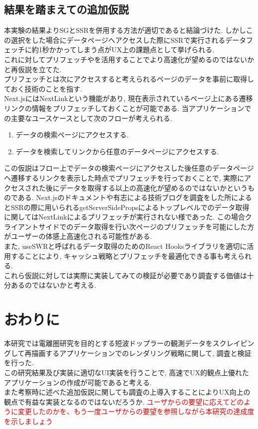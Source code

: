 \subsection{結果を踏まえての追加仮説}
本実験の結果よりSGとSSRを併用する方法が適切であると結論づけた.
しかしこの選択をした場合にデータページへアクセスした際にSSRで実行されるデータフェッチに約1秒かかってしまう点がUX上の課題点として挙げられる.\\
これに対してプリフェッチやを活用することでより高速化が望めるのではないかと再仮説を立てた.\\
プリフェッチとは次にアクセスすると考えられるページのデータを事前に取得しておく技術のことを指す.\\
Next.jsにはNextLinkという機能があり, 現在表示されているページ上にある遷移リンクの情報をプリフェッチしておくことが可能である.
当アプリケーションでの主要なユースケースとして次のフローが考えられる.\\
\begin{enumerate}
	\item データの検索ページにアクセスする.
	\item データを検索してリンクから任意のデータページにアクセスする.
\end{enumerate}
この仮説はフロー上でデータの検索ページにアクセスした後任意のデータページヘ遷移するリンクを表示した時点でプリフェッチを行っておくことで, 実際にアクセスされた後にデータを取得する以上の高速化が望めるのではないかというものである.
Next.jsのドキュメントや有志による技術ブログを調査をした所によるとSSRの際に用いられるgetServerSidePropsによるトップレベルでのデータ取得に関してはNextLinkによるプリフェッチが実行されない様であった.
この場合クライアントサイドでのデータ取得を行い次ページのプリフェッチを可能にした方がユーザーの体感上高速化される可能性がある.\\
また, useSWRと呼ばれるデータ取得のためのReact Hooksライブラリを適切に活用することにより, キャッシュ戦略とプリフェッチを最適化できる事も考えられる.\\
これら仮説に対しては実際に実装してみての検証が必要であり調査する価値は十分あるのではないかと考える.

\section{おわりに}
本研究では電離圏研究を目的とする短波ドップラーの観測データをスクレイピングして再描画するアプリケーションでのレンダリング戦略に関して, 調査と検証を行った.\\
この研究結果及び実装に適切なUI実装を行うことで, 高速でUX的観点上優れたアプリケーションの作成が可能であると考える.\\
また考察時に述べた追加仮説に関しても調査の上導入することによりUX向上の観点で有益な実装となるのではないだろうか.
\textcolor{red}{ユーザからの要望に応えてどのように変更したのかを、もう一度ユーザからの要望を参照しながら本研究の達成度を示しましょう}

